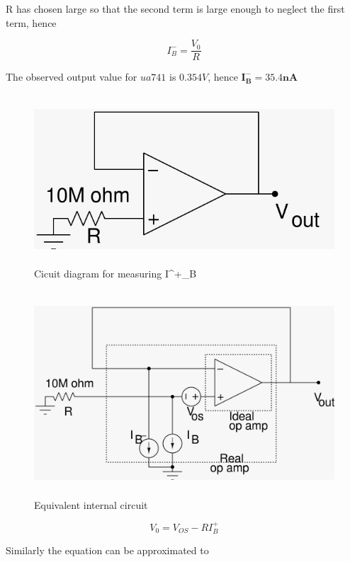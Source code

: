 \documentclass[12pt]{article}
\begin{document}
        R has chosen large so that the second term is large enough to neglect the first term, hence
        
        \begin{equation}
            I^-_B = \frac{V_0}{R}
        \end{equation}
        
        The observed output value for $ua 741$ is  $0.354V$, hence $\mathbf{I^-_B = 35.4nA}$
        \begin{figure}[H]
            \centering
            \includegraphics[width = 0.6\linewidth, height = 2.5in]{ibplus.jpeg}
            \caption{Cicuit diagram for measuring I^+_B}
        \end{figure}
        \begin{figure}[H]
            \centering
            \includegraphics[width = 0.8\linewidth, height = 3in]{ibplusreal.jpeg}
            \caption{Equivalent internal circuit}
        \end{figure}
        \begin{equation}
            V_0 = V_{OS} - RI^+_B
        \end{equation}
        
        Similarly the equation can be approximated to 
        
\end{document}
